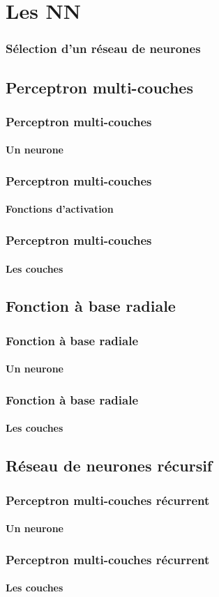 \section{Les NN}

\begin{frame}
 \frametitle{Sélection d'un réseau de neurones}
 
\end{frame}

\subsection{Perceptron multi-couches}
\begin{frame}
 \frametitle{Perceptron multi-couches}
 \framesubtitle{Un neurone}
 
\end{frame}

\begin{frame}
 \frametitle{Perceptron multi-couches}
 \framesubtitle{Fonctions d'activation}
 
\end{frame}

\begin{frame}
 \frametitle{Perceptron multi-couches}
 \framesubtitle{Les couches}
 
\end{frame}

\subsection{Fonction à base radiale}
\begin{frame}
 \frametitle{Fonction à base radiale}
 \framesubtitle{Un neurone}
 
\end{frame}

\begin{frame}
 \frametitle{Fonction à base radiale}
 \framesubtitle{Les couches}
 
\end{frame}

\subsection{Réseau de neurones récursif}
\begin{frame}
  \frametitle{Perceptron multi-couches récurrent}
  \framesubtitle{Un neurone}
  
\end{frame}

\begin{frame}
  \frametitle{Perceptron multi-couches récurrent}
  \framesubtitle{Les couches}
  
\end{frame}